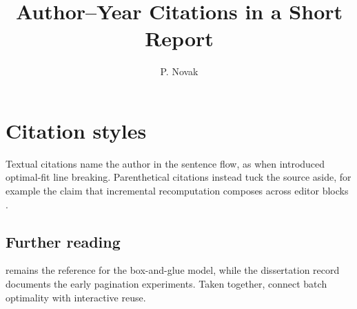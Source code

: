 \documentclass[11pt]{report}
\title{Author--Year Citations in a Short Report}
\author{P. Novak}
\date{}
\begin{document}
\maketitle

\chapter{Citation styles}

Textual citations name the author in the sentence flow, as when
\citet{plass81} introduced optimal-fit line breaking. Parenthetical
citations instead tuck the source aside, for example the claim that
incremental recomputation composes across editor blocks \citep{adapton}.

\section{Further reading}

\citet{knuth84} remains the reference for the box-and-glue model, while the
dissertation record \citep{plass-thesis} documents the early pagination
experiments. Taken together, \citep{plass81, adapton} connect batch
optimality with interactive reuse.



\end{document}

